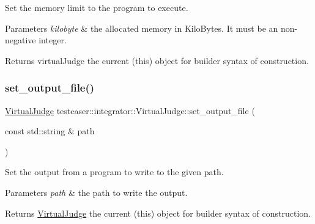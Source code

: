 Set the memory limit to the program to execute. 


\begin{DoxyParams}{Parameters}
{\em kilobyte} & the allocated memory in Kilo\+Bytes. It must be an non-\/negative integer. \\
\hline
\end{DoxyParams}
\begin{DoxyReturn}{Returns}
virtual\+Judge the current (this) object for builder syntax of construction. 
\end{DoxyReturn}
\mbox{\label{classtestcaser_1_1integrator_1_1VirtualJudge_ac806c80611eb6e6049f3376790d4b42a}} 
\subsubsection{\texorpdfstring{set\_output\_file()}{set\_output\_file()}}
{\footnotesize\ttfamily \mbox{\hyperlink{classtestcaser_1_1integrator_1_1VirtualJudge}{Virtual\+Judge}} testcaser\+::integrator\+::\+Virtual\+Judge\+::set\+\_\+output\+\_\+file (\begin{DoxyParamCaption}\item[{const std\+::string \&}]{path }\end{DoxyParamCaption})\hspace{0.3cm}{\ttfamily [inline]}}



Set the output from a program to write to the given path. 


\begin{DoxyParams}{Parameters}
{\em path} & the path to write the output. \\
\hline
\end{DoxyParams}
\begin{DoxyReturn}{Returns}
\mbox{\hyperlink{classtestcaser_1_1integrator_1_1VirtualJudge}{Virtual\+Judge}} the current (this) object for builder syntax of construction. 
\end{DoxyReturn}
\mbox{\label{classtestcaser_1_1integrator_1_1VirtualJudge_a121272932bb115881ad90be79ad7d0a7}} 
